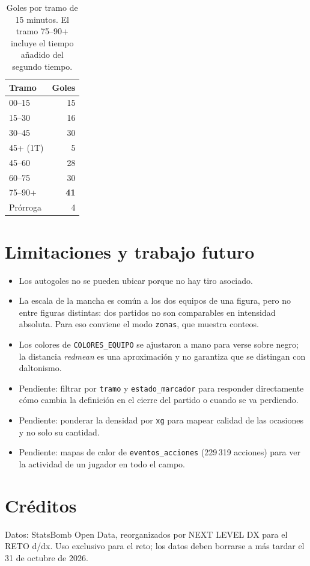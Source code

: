 \documentclass[11pt,a4paper]{article}
\begin{document}
\begin{table}[H]
\centering
\begin{tabular}{@{}lr@{}}
\toprule
Tramo & Goles \\
\midrule
00--15     & 15 \\
15--30     & 16 \\
30--45     & 30 \\
45+ (1T)   & 5 \\
45--60     & 28 \\
60--75     & 30 \\
75--90+    & \textbf{41} \\
Prórroga   & 4 \\
\bottomrule
\end{tabular}
\caption{Goles por tramo de 15 minutos. El tramo 75--90+ incluye el tiempo añadido del segundo tiempo.}
\label{tab:tramos}
\end{table}

\section{Limitaciones y trabajo futuro}

\begin{itemize}
  \item Los autogoles no se pueden ubicar porque no hay tiro asociado.
  \item La escala de la mancha es común a los dos equipos de una figura, pero no entre
    figuras distintas: dos partidos no son comparables en intensidad absoluta. Para eso
    conviene el modo \texttt{zonas}, que muestra conteos.
  \item Los colores de \texttt{COLORES\_EQUIPO} se ajustaron a mano para verse sobre negro;
    la distancia \emph{redmean} es una aproximación y no garantiza que se distingan con
    daltonismo.
  \item Pendiente: filtrar por \texttt{tramo} y \texttt{estado\_marcador} para responder
    directamente cómo cambia la definición en el cierre del partido o cuando se va perdiendo.
  \item Pendiente: ponderar la densidad por \texttt{xg} para mapear calidad de las ocasiones
    y no solo su cantidad.
  \item Pendiente: mapas de calor de \texttt{eventos\_acciones} (229\,319 acciones) para ver
    la actividad de un jugador en todo el campo.
\end{itemize}

\section*{Créditos}

Datos: StatsBomb Open Data, reorganizados por NEXT LEVEL DX para el RETO d/dx.
Uso exclusivo para el reto; los datos deben borrarse a más tardar el 31 de octubre de 2026.
\end{document}
